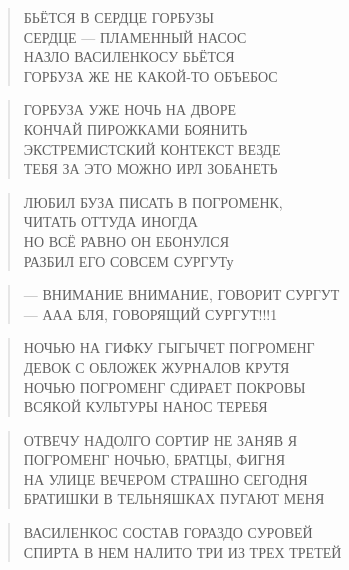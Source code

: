 \poemtitle{***}
\begin{verse}
БЬЁТСЯ В СЕРДЦЕ ГОРБУЗЫ\\
СЕРДЦЕ — ПЛАМЕННЫЙ НАСОС\\
НАЗЛО ВАСИЛЕНКОСУ БЬЁТСЯ\\
ГОРБУЗА ЖЕ НЕ КАКОЙ-ТО ОБЪЕБОС
\end{verse}

\poemtitle{***}
\begin{verse}
ГОРБУЗА УЖЕ НОЧЬ НА ДВОРЕ\\
КОНЧАЙ ПИРОЖКАМИ БОЯНИТЬ\\
ЭКСТРЕМИСТСКИЙ КОНТЕКСТ ВЕЗДЕ\\
ТЕБЯ ЗА ЭТО МОЖНО ИРЛ ЗОБАНЕТЬ
\end{verse}

\poemtitle{***}
\begin{verse}
ЛЮБИЛ БУЗА ПИСАТЬ В ПОГРОМЕНК,\\
ЧИТАТЬ ОТТУДА ИНОГДА\\
НО ВСЁ РАВНО ОН ЕБОНУЛСЯ\\
РАЗБИЛ ЕГО СОВСЕМ СУРГУТу
\end{verse}

\poemtitle{***}
\begin{verse}
— ВНИМАНИЕ ВНИМАНИЕ, ГОВОРИТ СУРГУТ\\
— ААА БЛЯ, ГОВОРЯЩИЙ СУРГУТ!!!1
\end{verse}

\poemtitle{***}
\begin{verse}
НОЧЬЮ НА ГИФКУ ГЫГЫЧЕТ ПОГРОМЕНГ\\
ДЕВОК С ОБЛОЖЕК ЖУРНАЛОВ КРУТЯ\\
НОЧЬЮ ПОГРОМЕНГ СДИРАЕТ ПОКРОВЫ\\
ВСЯКОЙ КУЛЬТУРЫ НАНОС ТЕРЕБЯ
\end{verse}

\poemtitle{***}
\begin{verse}
ОТВЕЧУ НАДОЛГО СОРТИР НЕ ЗАНЯВ Я\\
ПОГРОМЕНГ НОЧЬЮ, БРАТЦЫ, ФИГНЯ\\
НА УЛИЦЕ ВЕЧЕРОМ СТРАШНО СЕГОДНЯ\\
БРАТИШКИ В ТЕЛЬНЯШКАХ ПУГАЮТ МЕНЯ
\end{verse}

\poemtitle{***}
\begin{verse}
ВАСИЛЕНКОС СОСТАВ ГОРАЗДО СУРОВЕЙ\\
СПИРТА В НЕМ НАЛИТО ТРИ ИЗ ТРЕХ ТРЕТЕЙ
\end{verse}

